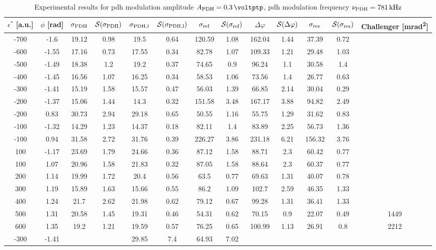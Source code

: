 \begin{landscape}
	\begin{table}
	\centering
	\begin{tabular}{|c|c|c|c|c|c|c|c|c|c|c|c|c|}
		\hline
		$\epsilon^*$ [a.u.] & $\phi$ [\si{\radian}] & $\sigma_{\text{PDH}}$ & $\mathcal{S}(\sigma_{\text{PDH}})$ & $\sigma_{\text{PDH,l}}$ & $\mathcal{S}(\sigma_{\text{PDH,l}})$  & $\sigma_{\text{ref}}$ & $\mathcal{S}(\sigma_{\text{ref}})$ & $\Delta \varphi$ & $\mathcal{S}(\Delta \varphi)$ & $\sigma_{\text{res}}$  & $\mathcal{S}(\sigma_{\text{res}})$ & Challenger [\si{\milli\radian\squared}] \\
		\hline
		\hline
		-700 & -1.6 & 19.12 & 0.98 & 19.5 & 0.64 & 120.59 & 1.08 & 162.04 & 1.44 & 37.39 & 0.72 & \\
		-600 & -1.55 & 17.16 & 0.73 & 17.55 & 0.34 & 82.78 & 1.07 & 109.33 & 1.21 & 29.48 & 1.03 & \\
		-500 & -1.49 & 18.38 & 1.2 & 19.2 & 0.37 & 74.65 & 0.9 & 96.24 & 1.1 & 30.58 & 1.4 & \\
		-400 & -1.45 & 16.56 & 1.07 & 16.25 & 0.34 & 58.53 & 1.06 & 73.56 & 1.4 & 26.77 & 0.63 & \\
		-300 & -1.41 & 15.19 & 1.58 & 15.57 & 0.47 & 56.03 & 1.39 & 66.85 & 2.14 & 30.04 & 0.29 & \\
		-200 & -1.37 & 15.06 & 1.44 & 14.3 & 0.32 & 151.58 & 3.48 & 167.17 & 3.88 & 94.82 & 2.49 & \\
		-200 & 0.83 & 30.73 & 2.94 & 29.18 & 0.65 & 50.55 & 1.16 & 55.75 & 1.29 & 31.62 & 0.83 & \\
		-100 & -1.32 & 14.29 & 1.23 & 14.37 & 0.18 & 82.11 & 1.4 & 83.89 & 2.25 & 56.73 & 1.36 & \\
		-100 & 0.94 & 31.58 & 2.72 & 31.76 & 0.39 & 226.27 & 3.86 & 231.18 & 6.21 & 156.32 & 3.76 & \\
		100 & -1.17 & 23.69 & 1.79 & 24.66 & 0.36 & 87.12 & 1.58 & 88.71 & 2.3 & 60.42 & 0.77 & \\
		100 & 1.07 & 20.96 & 1.58 & 21.83 & 0.32 & 87.05 & 1.58 & 88.64 & 2.3 & 60.37 & 0.77 & \\
		200 & 1.14 & 19.99 & 1.72 & 20.4 & 0.56 & 63.5 & 0.77 & 69.63 & 1.31 & 40.07 & 0.78 & \\
		300 & 1.19 & 15.89 & 1.63 & 15.66 & 0.55 & 86.2 & 1.09 & 102.7 & 2.59 & 46.35 & 1.33 & \\
		400 & 1.24 & 21.7 & 2.62 & 21.98 & 0.62 & 79.12 & 0.67 & 99.28 & 1.31 & 36.41 & 1.33 & \\
		500 & 1.31 & 20.58 & 1.45 & 19.31 & 0.46 & 54.31 & 0.62 & 70.15 & 0.9 & 22.07 & 0.49 & 1449\\
		600 & 1.35 & 19.2 & 1.21 & 19.59 & 0.57 & 76.25 & 0.65 & 100.99 & 1.13 & 26.91 & 0.8 & 2212\\
		\hline
		\hline
		-300 & -1.41 & & & 29.85 & 7.4 & 64.93 & 7.02 & & & & &\\
		\hline 
	\end{tabular}
	\caption{Experimental results for \gls{pdh} modulation amplitude $\tind{A}{PDH} = \SI{0.3}{\voltptp}$, \gls{pdh} modulation frequency $\nu_{\text{PDH}} = \SI{781}{\kilo\hertz}$}
	\end{table}
	

\end{landscape}

